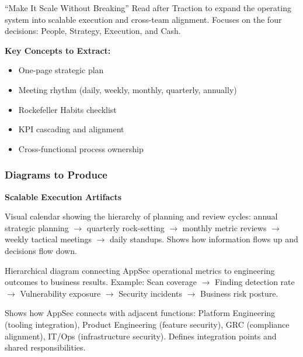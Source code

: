 \documentclass[11pt,letterpaper]{article}
\begin{document}
\begin{bookbox}{``Make It Scale Without Breaking''}
Read after Traction to expand the operating system into scalable execution and cross-team alignment. Focuses on the four decisions: People, Strategy, Execution, and Cash.

\vspace{0.5cm}

\textbf{Key Concepts to Extract:}
\begin{itemize}[nosep]
    \item One-page strategic plan
    \item Meeting rhythm (daily, weekly, monthly, quarterly, annually)
    \item Rockefeller Habits checklist
    \item KPI cascading and alignment
    \item Cross-functional process ownership
\end{itemize}
\end{bookbox}

\subsubsection{Diagrams to Produce}

\begin{diagrambox}
\textbf{Scalable Execution Artifacts}

\begin{description}[leftmargin=1.5cm, style=nextline]
    \item[Operating Rhythm Map]
    Visual calendar showing the hierarchy of planning and review cycles: annual strategic planning $\rightarrow$ quarterly rock-setting $\rightarrow$ monthly metric reviews $\rightarrow$ weekly tactical meetings $\rightarrow$ daily standups. Shows how information flows up and decisions flow down.

    \item[KPI Tree]
    Hierarchical diagram connecting AppSec operational metrics to engineering outcomes to business results. Example: Scan coverage $\rightarrow$ Finding detection rate $\rightarrow$ Vulnerability exposure $\rightarrow$ Security incidents $\rightarrow$ Business risk posture.

    \item[Organizational Interface Map]
    Shows how AppSec connects with adjacent functions: Platform Engineering (tooling integration), Product Engineering (feature security), GRC (compliance alignment), IT/Ops (infrastructure security). Defines integration points and shared responsibilities.
\end{description}
\end{diagrambox}
\end{document}
